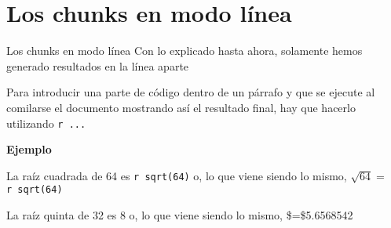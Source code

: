 \documentclass[
  ignorenonframetext,
]{beamer}
\begin{document}
\section{Los chunks en modo línea}\label{los-chunks-en-modo-luxednea}

\begin{frame}[fragile]{Los chunks en modo línea}
\label{los-chunks-en-modo-luxednea-1}
Con lo explicado hasta ahora, solamente hemos generado resultados en la
línea aparte

Para introducir una parte de código dentro de un párrafo y que se
ejecute al comilarse el documento mostrando así el resultado final, hay
que hacerlo utilizando \texttt{\textasciigrave{}r\ ...\textasciigrave{}}

\textbf{Ejemplo}

La raíz cuadrada de 64 es
\texttt{\textasciigrave{}r\ sqrt(64)\textasciigrave{}} o, lo que viene
siendo lo mismo,
\(\sqrt{64}=\)\texttt{\textasciigrave{}r\ sqrt(64)\textasciigrave{}}

La raíz quinta de 32 es 8 o, lo que viene siendo lo mismo,
\$=\$5.6568542
\end{frame}
\end{document}
